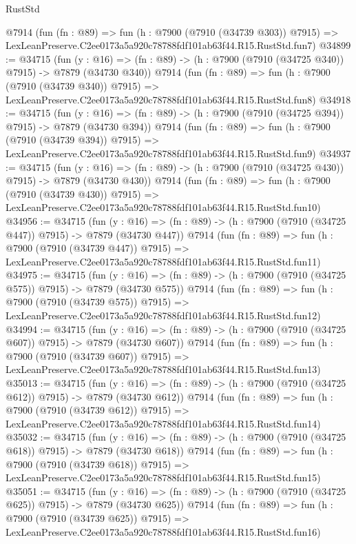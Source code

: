 \begin{lexlean}{RustStd}
\begin{coremodule}
    @7914
    (fun (fn : @89) =>
    fun (h : @7900 (@7910 (@34739 @303)) @7915) =>
    LexLeanPreserve.C2ee0173a5a920c78788fdf101ab63f44.R15.RustStd.fun7)
@34899 := @34715
    (fun (y : @16) => (fn : @89) -> (h : @7900 (@7910 (@34725 @340)) @7915) -> @7879 (@34730 @340))
    @7914
    (fun (fn : @89) =>
    fun (h : @7900 (@7910 (@34739 @340)) @7915) =>
    LexLeanPreserve.C2ee0173a5a920c78788fdf101ab63f44.R15.RustStd.fun8)
@34918 := @34715
    (fun (y : @16) => (fn : @89) -> (h : @7900 (@7910 (@34725 @394)) @7915) -> @7879 (@34730 @394))
    @7914
    (fun (fn : @89) =>
    fun (h : @7900 (@7910 (@34739 @394)) @7915) =>
    LexLeanPreserve.C2ee0173a5a920c78788fdf101ab63f44.R15.RustStd.fun9)
@34937 := @34715
    (fun (y : @16) => (fn : @89) -> (h : @7900 (@7910 (@34725 @430)) @7915) -> @7879 (@34730 @430))
    @7914
    (fun (fn : @89) =>
    fun (h : @7900 (@7910 (@34739 @430)) @7915) =>
    LexLeanPreserve.C2ee0173a5a920c78788fdf101ab63f44.R15.RustStd.fun10)
@34956 := @34715
    (fun (y : @16) => (fn : @89) -> (h : @7900 (@7910 (@34725 @447)) @7915) -> @7879 (@34730 @447))
    @7914
    (fun (fn : @89) =>
    fun (h : @7900 (@7910 (@34739 @447)) @7915) =>
    LexLeanPreserve.C2ee0173a5a920c78788fdf101ab63f44.R15.RustStd.fun11)
@34975 := @34715
    (fun (y : @16) => (fn : @89) -> (h : @7900 (@7910 (@34725 @575)) @7915) -> @7879 (@34730 @575))
    @7914
    (fun (fn : @89) =>
    fun (h : @7900 (@7910 (@34739 @575)) @7915) =>
    LexLeanPreserve.C2ee0173a5a920c78788fdf101ab63f44.R15.RustStd.fun12)
@34994 := @34715
    (fun (y : @16) => (fn : @89) -> (h : @7900 (@7910 (@34725 @607)) @7915) -> @7879 (@34730 @607))
    @7914
    (fun (fn : @89) =>
    fun (h : @7900 (@7910 (@34739 @607)) @7915) =>
    LexLeanPreserve.C2ee0173a5a920c78788fdf101ab63f44.R15.RustStd.fun13)
@35013 := @34715
    (fun (y : @16) => (fn : @89) -> (h : @7900 (@7910 (@34725 @612)) @7915) -> @7879 (@34730 @612))
    @7914
    (fun (fn : @89) =>
    fun (h : @7900 (@7910 (@34739 @612)) @7915) =>
    LexLeanPreserve.C2ee0173a5a920c78788fdf101ab63f44.R15.RustStd.fun14)
@35032 := @34715
    (fun (y : @16) => (fn : @89) -> (h : @7900 (@7910 (@34725 @618)) @7915) -> @7879 (@34730 @618))
    @7914
    (fun (fn : @89) =>
    fun (h : @7900 (@7910 (@34739 @618)) @7915) =>
    LexLeanPreserve.C2ee0173a5a920c78788fdf101ab63f44.R15.RustStd.fun15)
@35051 := @34715
    (fun (y : @16) => (fn : @89) -> (h : @7900 (@7910 (@34725 @625)) @7915) -> @7879 (@34730 @625))
    @7914
    (fun (fn : @89) =>
    fun (h : @7900 (@7910 (@34739 @625)) @7915) =>
    LexLeanPreserve.C2ee0173a5a920c78788fdf101ab63f44.R15.RustStd.fun16)

\end{coremodule}
\end{lexlean}
